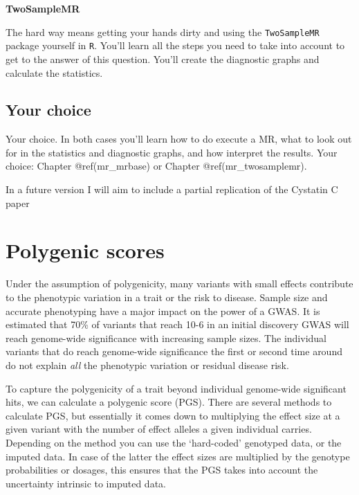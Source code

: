 \documentclass[
]{book}
\begin{document}
\textbf{TwoSampleMR}

The hard way means getting your hands dirty and using the \texttt{TwoSampleMR} package yourself in \texttt{R}. You'll learn all the steps you need to take into account to get to the answer of this question. You'll create the diagnostic graphs and calculate the statistics.

\hypertarget{your-choice}{%
\subsection{Your choice}\label{your-choice}}

Your choice. In both cases you'll learn how to do execute a MR, what to look out for in the statistics and diagnostic graphs, and how interpret the results. Your choice: Chapter @ref(mr\_mrbase) or Chapter @ref(mr\_twosamplemr).

In a future version I will aim to include a partial replication of the Cystatin C paper\citep{vanderlaan2016}

\hypertarget{polygenic-scores}{%
\section{Polygenic scores}\label{polygenic-scores}}

Under the assumption of polygenicity, many variants with small effects contribute to the phenotypic variation in a trait or the risk to disease. Sample size and accurate phenotyping have a major impact on the power of a GWAS. It is estimated that 70\% of variants that reach 10-6 in an initial discovery GWAS will reach genome-wide significance with increasing sample sizes. The individual variants that do reach genome-wide significance the first or second time around do not explain \emph{all} the phenotypic variation or residual disease risk.

To capture the polygenicity of a trait beyond individual genome-wide significant hits, we can calculate a polygenic score (PGS). There are several methods to calculate PGS, but essentially it comes down to multiplying the effect size at a given variant with the number of effect alleles a given individual carries.
Depending on the method you can use the `hard-coded' genotyped data, or the imputed data. In case of the latter the effect sizes are multiplied by the genotype probabilities or dosages, this ensures that the PGS takes into account the uncertainty intrinsic to imputed data.
\end{document}
